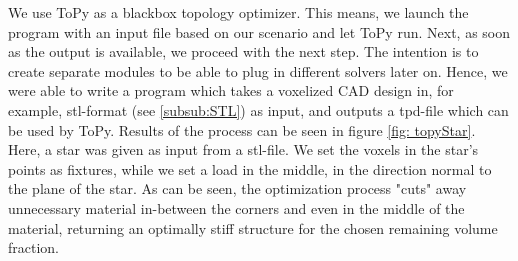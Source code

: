 We use ToPy as a blackbox topology optimizer. This means, we launch the program with an input file based on our scenario and let ToPy run. Next, as soon as the output is available, we proceed with the next step. The intention is to create separate modules to be able to plug in different solvers later on. Hence, we were able to write a program which takes a voxelized CAD design in, for example, stl-format (see \autoref{subsub:STL}) as input, and outputs a tpd-file which can be used by ToPy. Results of the process can be seen in figure \ref{fig: topyStar}. Here, a star was given as input from a stl-file. We set the voxels in the star's points as fixtures, while we set a load in the middle, in the direction normal to the plane of the star. As can be seen, the optimization process "cuts" away unnecessary material in-between the corners and even in the middle of the material, returning an optimally stiff structure for the chosen remaining volume fraction. 
